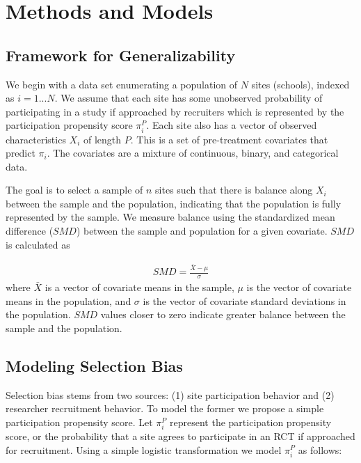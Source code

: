 \documentclass[man,floatsintext]{apa6}
\begin{document}
\hypertarget{methods-and-models}{%
\section{Methods and Models}\label{methods-and-models}}

\hypertarget{framework-for-generalizability}{%
\subsection{Framework for Generalizability}\label{framework-for-generalizability}}

We begin with a data set enumerating a population of \(N\) sites (schools), indexed as \(i = 1 ... N\). We assume that each site has some unobserved probability of participating in a study if approached by recruiters which is represented by the participation propensity score \(\pi_i^P\). Each site also has a vector of observed characteristics \(X_i\) of length \(P\). This is a set of pre-treatment covariates that predict \(\pi_i\). The covariates are a mixture of continuous, binary, and categorical data.

The goal is to select a sample of \(n\) sites such that there is balance along \(X_i\) between the sample and the population, indicating that the population is fully represented by the sample. We measure balance using the standardized mean difference (\(SMD\)) between the sample and population for a given covariate. \(SMD\) is calculated as

\begin{align}
  SMD = \frac{\bar{X}-\mu}{\sigma}
\end{align}
where \(\bar{X}\) is a vector of covariate means in the sample, \(\mu\) is the vector of covariate means in the population, and \(\sigma\) is the vector of covariate standard deviations in the population. \(SMD\) values closer to zero indicate greater balance between the sample and the population.

\hypertarget{modeling-selection-bias}{%
\subsection{Modeling Selection Bias}\label{modeling-selection-bias}}

Selection bias stems from two sources: (1) site participation behavior and (2) researcher recruitment behavior. To model the former we propose a simple participation propensity score. Let \(\pi^P_i\) represent the participation propensity score, or the probability that a site agrees to participate in an RCT if approached for recruitment. Using a simple logistic transformation we model \(\pi^P_i\) as follows:
\end{document}
